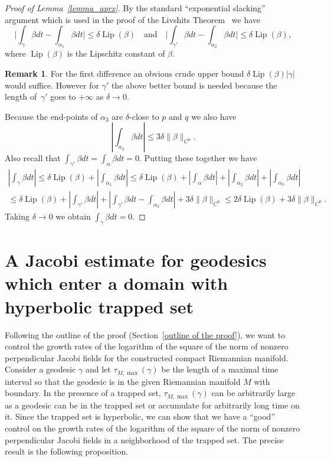 \documentclass[10pt]{amsart}
\DeclareMathOperator{\Lip}{Lip}
\theoremstyle{definition}
\newtheorem{remark}[theorem]{Remark}
\renewcommand{\>}{{\rangle}}
\newcommand{\<}{{\langle}}
\begin{document}
\begin{proof}[Proof of Lemma~\ref{lemma_aprx}]
By the standard ``exponential slacking'' argument which is used in the proof of the Livshits Theorem~\cite{L71} we have
\[
\biggl|\int_\gamma\beta dt-\int_{\alpha_1}\beta dt \biggr|\le\delta \Lip(\beta)
\quad
\text{and}
\quad
\biggl|\int_{\gamma'}\beta dt-\int_{\alpha_2}\beta dt \biggl|\le\delta \Lip(\beta),
\]
where $\Lip(\beta)$ is the Lipschitz constant of $\beta$.
\begin{remark} For the first difference an obvious crude upper bound $\delta \Lip(\beta)|\gamma|$ would suffice. However for $\gamma'$ the above better bound is needed because the length of~$\gamma'$ goes to $+\infty$ as $\delta\to 0$.
\end{remark}
Because the end-points of $\alpha_3$ are $\delta$-close to $p$ and $q$ we also have
\[
\left|\int_{\alpha_3}\beta dt \right|\le 3\delta\|\beta\|_{C^0}.
\]
Also recall that $\int_{\gamma'}\beta dt=\int_{\alpha}\beta dt=0$. Putting these together we have
\begin{multline*}
\left|\int_{\gamma}\beta dt \right|\le\delta \Lip(\beta)+\left|\int_{\alpha_1}\beta dt \right| \le \delta \Lip(\beta)+\left|\int_{\alpha}\beta dt \right| +\left|\int_{\alpha_2}\beta dt \right| +\left|\int_{\alpha_3}\beta dt \right| \\
\le \delta \Lip(\beta)+\left|\int_{\gamma'}\beta dt \right|+\left|\int_{\gamma'}\beta dt-\int_{\alpha_2}\beta dt \right|+3\delta\|\beta\|_{C^0}\le 2\delta \Lip(\beta)+3\delta\|\beta\|_{C^0}.
\end{multline*}
Taking $\delta\to 0$ we obtain $\int_\gamma\beta dt=0$.
\end{proof}

\section{A Jacobi estimate for geodesics which enter a domain with hyperbolic trapped set}\label{sec: mu_estimate_domain}

Following the outline of the proof (Section~\ref{outline of the proof}), we want to control the growth rates of the logarithm of the square of the norm of nonzero perpendicular Jacobi fields for the constructed compact Riemannian manifold. Consider a geodesic $\gamma$ and let $\tau_{M,\max}(\gamma)$ be the length of a maximal time interval so that the geodesic is in the given Riemannian manifold $M$ with boundary. In the presence of a trapped set, $\tau_{M,\max}(\gamma)$ can be arbitrarily large as a geodesic can be in the trapped set or accumulate for arbitrarily long time on it. Since the trapped set is hyperbolic, we can show that we have a ``good'' control on the growth rates of the logarithm of the square of the norm of nonzero perpendicular Jacobi fields in a neighborhood of the trapped set. The precise result is the following proposition.
\end{document}
